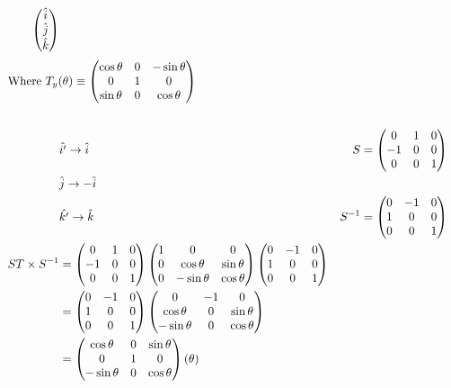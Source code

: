 \documentclass{article}
\begin{document}
\begin{align*}
\begin{pmatrix}
\hat{i}\\
\hat{j}\\
\hat{k}
\end{pmatrix}\\
\intertext{Where $T_{y}(\theta) \equiv \begin{pmatrix}
\cos \theta&0&-\sin\theta\\
0&1&0\\
\sin \theta&0&\cos\theta\\
\end{pmatrix}$}\\
&\hat{i'} \rightarrow \hat{i} & S&=\begin{pmatrix}
0&1&0\\
-1&0&0\\
0&0&1
\end{pmatrix}\\
&\hat{j} \rightarrow -\hat{i}\\
&\hat{k'} \rightarrow \hat{k} & S^{-1}&=\begin{pmatrix}
0&-1&0\\
1&0&0\\
0&0&1
\end{pmatrix}\\
ST \times S^{-1}&=\begin{pmatrix}
0&1&0\\
-1&0&0\\
0&0&1
\end{pmatrix} \begin{pmatrix}
1&0&0\\
0&\cos \theta&\sin \theta\\
0&-\sin\theta&\cos\theta\\
\end{pmatrix} \begin{pmatrix}
0&-1&0\\
1&0&0\\
0&0&1
\end{pmatrix}\\
&=\begin{pmatrix}
0&-1&0\\
1&0&0\\
0&0&1
\end{pmatrix}
\begin{pmatrix}
0&-1&0\\
\cos \theta&0&\sin \theta\\
-\sin\theta&0&\cos\theta\\
\end{pmatrix}\\
&=\begin{pmatrix}
\cos\theta&0&\sin\theta\\
0&1&0\\
-\sin\theta&0&\cos\theta\\
\end{pmatrix}(\theta)\\ 
\end{align*}
\end{document}
